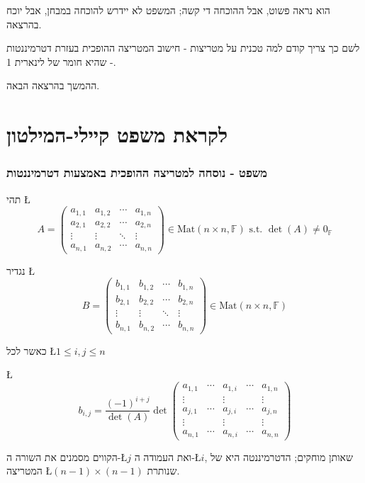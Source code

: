\documentclass[english,hebrew]{article}
\begin{document}
הוא נראה פשוט, אבל ההוכחה די קשה; המשפט לא יידרש להוכחה במבחן, אבל
יוכח בהרצאה. 

לשם כך צריך קודם למה טכנית על מטריצות - חישוב המטריצה ההופכית בעזרת
דטרמיננטות - שהיא חומר של לינארית 1.

ההמשך בהרצאה הבאה.

\part{לקראת משפט קיילי-המילטון}

\section{משפט - נוסחה למטריצה ההופכית באמצעות דטרמיננטות}

תהי \L{%
\[
A=\begin{pmatrix}a_{1,1} & a_{1,2} & \cdots & a_{1,n}\\
a_{2,1} & a_{2,2} & \cdots & a_{2,n}\\
\vdots & \vdots & \ddots & \vdots\\
a_{n,1} & a_{n,2} & \cdots & a_{n,n}
\end{pmatrix}\in\text{Mat}\left(n\times n,\mathbb{F}\right)\text{ s.t. }\det(A)\ne0_{\mathbb{F}}
\]
}%

נגדיר \L{%
\[
B=\begin{pmatrix}b_{1,1} & b_{1,2} & \cdots & b_{1,n}\\
b_{2,1} & b_{2,2} & \cdots & b_{2,n}\\
\vdots & \vdots & \ddots & \vdots\\
b_{n,1} & b_{n,2} & \cdots & b_{n,n}
\end{pmatrix}\in\text{Mat}\left(n\times n,\mathbb{F}\right)
\]
}%

כאשר לכל \L{$1\le i,j\le n$}

\L{%
\[
b_{i,j}=\frac{(-1)^{i+j}}{\det(A)}\det\left(\begin{array}{cc|c|cc}
a_{1,1} & \cdots & a_{1,i} & \cdots & a_{1,n}\\
\vdots &  & \vdots &  & \vdots\\
\hline a_{j,1} & \cdots & a_{j,i} & \cdots & a_{j,n}\\
\hline \vdots &  & \vdots &  & \vdots\\
a_{n,1} & \cdots & a_{n,i} & \cdots & a_{n,n}
\end{array}\right)
\]
}%

הקווים מסמנים את השורה ה-\L{$j$} ואת העמודה ה-\L{$i$}, שאותן מוחקים;
הדטרמיננטה היא של המטריצה \L{$(n-1)\times(n-1)$} שנותרת.
\end{document}
